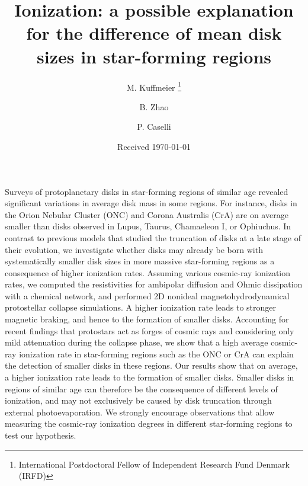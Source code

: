 \documentclass{aa}
\begin{document}
 


   \title{Ionization: a possible explanation for the difference of mean disk sizes in star-forming regions}

   \author{M. Kuffmeier
          \fnmsep\thanks{International Postdoctoral Fellow of Independent Research Fund Denmark (IRFD)}
          \and
          B. Zhao
          \and
          P. Caselli 
          }


   \date{Received \today}

 
  \abstract
   {Surveys of protoplanetary disks in star-forming regions of similar age revealed significant variations in average disk mass in some regions. For instance, disks in the Orion Nebular Cluster (ONC) and Corona Australis (CrA) are on average smaller than disks observed in Lupus, Taurus, Chamaeleon I, or Ophiuchus.}
   {In contrast to previous models that studied the truncation of disks at a late stage of their evolution, we investigate whether disks may already be born with systematically smaller disk sizes in more massive star-forming regions as a consequence of higher ionization rates. }
   {Assuming various cosmic-ray ionization rates, we computed the resistivities for ambipolar diffusion and Ohmic dissipation with a chemical network, and performed 2D nonideal magnetohydrodynamical protostellar collapse simulations. }
   {A higher ionization rate leads to stronger magnetic braking, and hence to the formation of smaller disks. 
   Accounting for recent findings that protostars act as forges of cosmic rays and considering only mild attenuation during the collapse phase, we show that a high average cosmic-ray ionization rate in star-forming regions such as the ONC or CrA can explain the detection of smaller disks in these regions. }
   {Our results show that on average, a higher ionization rate leads to the formation of smaller disks. 
   Smaller disks in regions of similar age can therefore be the consequence of different levels of ionization, and may not exclusively be caused by disk truncation through external photoevaporation. 
   We strongly encourage observations that allow measuring the cosmic-ray ionization degrees in different star-forming regions to test our hypothesis.    }
\end{document}
